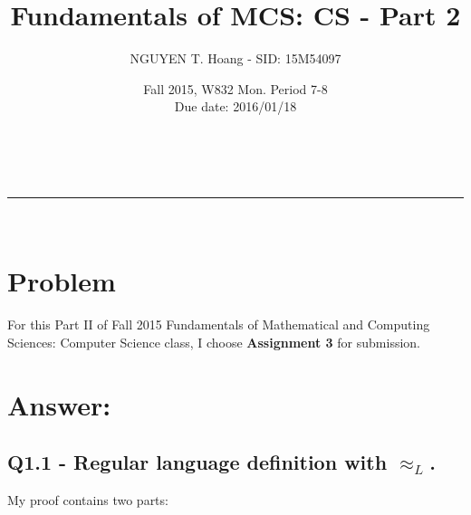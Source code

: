 \documentclass[a4paper,12pt]{article}
\makeatletter
\newcommand{\linia}{\rule{\linewidth}{0.5pt}}
\renewcommand{\maketitle} {
\begin{center}
\vspace{2ex}
{\huge \textsc{\@title}}
\vspace{1ex}
\\
\linia\\
\@author \hfill \@date
\vspace{4ex}
\end{center}
}
\makeatother
\begin{document}

\title{Fundamentals of MCS: CS - Part 2}

\author{NGUYEN T. Hoang - SID: 15M54097}

\date{Fall 2015, W832 Mon. Period 7-8 \\ \hfill Due date: 2016/01/18}

\maketitle

\vspace {2em}

\section*{Problem}
\noindent
For this Part II of Fall 2015 Fundamentals of Mathematical and Computing Sciences: Computer Science class, I choose \textbf{Assignment 3} for submission.



\pagebreak

\section*{Answer:}



\subsection*{Q1.1 - Regular language definition with $\approx_{L}$.} 

\noindent
My proof contains two parts: 
\end{document}
